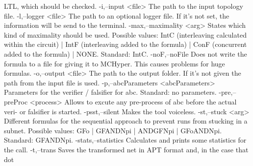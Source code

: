                                          LTL, which should be checked.
 -i,--input <file>                       The path to the input topology
                                         file.
 -l,--logger <file>                      The path to an optional logger
                                         file. If it's not set, the
                                         information will be send to the
                                         terminal.
 -max,--maximality <arg>                 States which kind of maximality
                                         should be used. Possible values:
                                         IntC (interleaving calculated
                                         within the circuit)  | IntF
                                         (interleaving added to the
                                         formula)  | ConF (concurrent
                                         added to the formula)  | NONE.
                                         Standard: IntC.
 -noF,--noFile                           Does not write the formula to a
                                         file for giving it to MCHyper.
                                         This causes problems for huge
                                         formulas.
 -o,--output <file>                      The path to the output folder. If
                                         it's not given the path from the
                                         input file is used.
 -p,--abcParameters <abcParameters>      Parameters for the verifier /
                                         falsifier for abc. Standard: no
                                         parameters.
 -pre,--preProc <process>                Allows to excute any pre-process
                                         of abc before the actual veri- or
                                         falsifier is started.
 -psst,--silent                          Makes the tool voiceless.
 -st,--stuck <arg>                       Different formulas for the
                                         sequential approach to prevent
                                         runs from stucking in a subnet.
                                         Possible values: GFo | GFANDNpi |
                                         ANDGFNpi | GFoANDNpi. Standard:
                                         GFANDNpi.
 -stats,--statistics                     Calculates and prints some
                                         statistics for the call.
 -t,--trans                              Saves the transformed net in APT
                                         format and, in the case that dot
